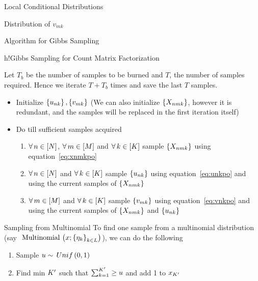 \documentclass{article}
\begin{document}
\begin{question}
\begin{qsection}{Local Conditional Distributions}
\begin{qsubsection}{Distribution of $v_{mk}$}
		\end{qsubsection}
		
	\end{qsection}

	\begin{qsection}{Algorithm for Gibbs Sampling}

		\begin{algo}{h!}{Gibbs Sampling for Count Matrix Factorization}

			Let $T_b$ be the number of samples to be burned and $T$, the number of samples required. Hence we iterate $T + T_b$ times and save the last $T$ samples.

			\begin{itemize}
				\item Initialize $\left\{ u_{nk} \right\}, \left\{ v_{mk} \right\}$ (We can also initialize $\left\{ X_{nmk} \right\}$, however it is redundant, and the samples will be replaced in the first iteration itself)
				\item Do till sufficient samples acquired
					\begin{enumerate}
						\item $\forall\, n \in \left[ N \right]$, $\forall\, m \in \left[ M \right]$ and $\forall\, k \in \left[ K \right]$ sample $\left\{ X_{nmk} \right\}$ using equation~\ref{eq:xnmkpo}
						\item $\forall\, n \in \left[ N \right]$ and $\forall\, k \in \left[ K \right]$ sample $\left\{ u_{nk} \right\}$ using equation~\ref{eq:unkpo} and using the current samples of $\left\{ X_{nmk} \right\}$
						\item $\forall\, m \in \left[ M \right]$ and $\forall\, k \in \left[ K \right]$ sample $\left\{ v_{mk} \right\}$ using equation~\ref{eq:vnkpo} and using the current samples of $\left\{ X_{nmk} \right\}$ and $\left\{ u_{nk} \right\}$
					\end{enumerate}
			\end{itemize}

		\end{algo}

		\begin{qsubsection}{Sampling from Multinomial}
			To find one sample from a multinomial distribution (say $\func{\mt{Multinomial}}{x; \set{\eta_k}_{k \in {L}}}$), we can do the following

			\begin{enumerate}
				\item Sample $u \sim \func{Unif}{0, 1}$
				\item Find min $K^{\prime}$ such that $\sum_{k = 1}^{K^{\prime}} \ge u$ and add 1 to $x_{K^{\prime}}$
			\end{enumerate}
		\end{qsubsection}
		
	\end{qsection}

\end{question}
\end{document}
